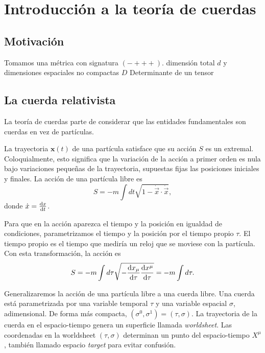 \chapter{Introducción a la teoría de cuerdas}


\section{Motivación}




Tomamos una métrica con signatura $(-+++)$.
dimensión total $d$ y dimensiones espaciales no compactas $D$
Determinante de un tensor

\section{La cuerda relativista}


La teoría de cuerdas parte de considerar que las entidades fundamentales son cuerdas
en vez de partículas. 

La trayectoria $\mathbf x(t)$ de una partícula satisface que su acción $S$ es un extremal.
Coloquialmente, esto significa que la variación de la acción a primer orden es nula bajo
variaciones pequeñas de la trayectoria, supuestas fijas las posiciones iniciales y finales.
La acción de una partícula libre es
\begin{equation}
  S=-m\int dt \sqrt{1-\dot {\vec{x}} \cdot \dot {\vec{x}}},
\end{equation}
donde $\dot x = \dv{x}{t}$.

Para que en la acción aparezca el tiempo y la posición en igualdad de condiciones,
parametrizamos el tiempo y la posición por el tiempo propio $\tau$. 
El tiempo propio es el tiempo que mediría un reloj que se moviese con la partícula.
Con esta transformación, la acción es
\begin{equation}
 S = -m\int d\tau \sqrt{-\dv{x_\mu}{\tau}\dv{x^\mu}{\tau}}=-m\int d\tau .
\end{equation}

Generalizaremos la acción de una partícula libre a una cuerda libre.
Una cuerda está parametrizada por una variable temporal $\tau$ y una variable espacial $\sigma$, adimensional.
De forma más compacta, $(\sigma^0,\sigma^1)=(\tau,\sigma)$. 
La trayectoria de la cuerda en el espacio-tiempo genera un superficie llamada \emph{worldsheet}.
Las coordenadas en la worldsheet $(\tau,\sigma)$ determinan un punto del espacio-tiempo $X^\mu$, también llamado
espacio \emph{target} para evitar confusión.

